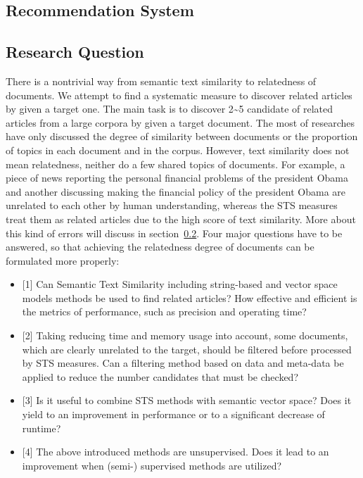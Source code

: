 \subsection{Recommendation System}

\subsection{Research Question}

There is a nontrivial way from semantic text similarity to relatedness of documents. We attempt to find a systematic measure to discover related articles by given a target one. The main task is to discover 2\textasciitilde 5 candidate of related articles from a large corpora by given a target document. The most of researches have only discussed the degree of similarity between documents or the proportion of topics in each document and in the corpus. However, text similarity does not mean relatedness, neither do a few shared topics of documents. For example, a piece of news reporting the personal financial problems of the president Obama and another discussing making the financial policy of the president Obama are unrelated to each other by human understanding, whereas the STS measures treat them as related articles due to the high score of text similarity. More about this kind of errors will discuss in section~\ref{}. Four major questions have to be answered, so that achieving the relatedness degree of documents can be formulated more properly: 

\begin{itemize}
    \item[1.] \label{q:1}[1] Can Semantic Text Similarity including string-based and vector space models methods be used to find related articles? How effective and efficient is the metrics of performance, such as precision and operating time?
    \item[2.] \label{q:2}[2] Taking reducing time and memory usage into account, some documents, which are clearly unrelated to the target, should be filtered before processed by STS measures.  Can a filtering method based on data and meta-data be applied to reduce the number candidates that must be checked?
    \item[3.] \label{q:3}[3] Is it useful to combine STS methods with semantic vector space? Does it yield to an improvement in performance or to a significant decrease of runtime?
    \item[4.] \label{q:4}[4] The above introduced methods are unsupervised. Does it lead to an improvement when (semi-) supervised methods are utilized?
\end{itemize}